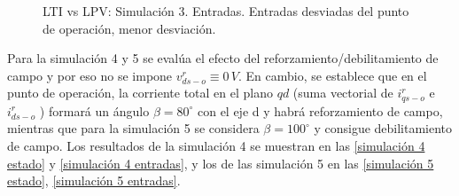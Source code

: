 \documentclass[a4paper, 10pt, onecolumn,journal]{ieeeconf}
\begin{document}
\begin{figure}[thpb]
	\centering
	\begin{adjustbox}{max width=\columnwidth}
	\end{adjustbox}
	\caption{LTI vs LPV: Simulación 3. Entradas. Entradas desviadas del punto de operación, menor desviación.}
	\label{simulación 3 entradas}
\end{figure}

Para la simulación 4 y 5 se evalúa el efecto del reforzamiento/debilitamiento de campo y por eso no se impone $v^r_{ds-o} \equiv 0\, V$.
En cambio, se establece que en el punto de operación, la corriente total en el plano $qd$ (suma vectorial de $i^r_{qs-o}$ e $i^r_{ds-o}$ ) formará un ángulo $\beta = 80^\circ$ con el eje d y habrá reforzamiento de campo,
mientras que para la simulación 5 se considera  $\beta = 100^\circ$ y consigue debilitamiento de campo. Los resultados
de la simulación 4 se muestran en las \cref{simulación 4 estado}  y \cref{simulación 4 entradas}, y los de las simulación 5 en las \cref{simulación 5 estado}, \cref{simulación 5 entradas}.
\end{document}
